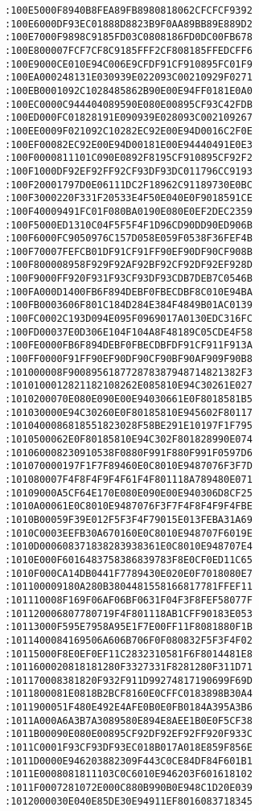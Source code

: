 \begin{lstlisting}[language={}, basicstyle=\scriptsize, caption=Машинний код]
:100E5000F8940B8FEA89FB8980818062CFCFCF9392
:100E6000DF93EC01888D8823B9F0AA89BB89E889D2
:100E7000F9898C9185FD03C0808186FD0DC00FB678
:100E800007FCF7CF8C9185FFF2CF808185FFEDCFF6
:100E9000CE010E94C006E9CFDF91CF910895FC01F9
:100EA000248131E030939E022093C00210929F0271
:100EB0001092C1028485862B90E00E94FF0181E0A0
:100EC0000C944404089590E080E00895CF93C42FDB
:100ED000FC01828191E090939E028093C002109267
:100EE0009F021092C10282EC92E00E94D0016C2F0E
:100EF00082EC92E00E94D00181E00E94440491E0E3
:100F0000811101C090E0892F8195CF910895CF92F2
:100F1000DF92EF92FF92CF93DF93DC011796CC9193
:100F20001797D0E06111DC2F18962C91189730E0BC
:100F3000220F331F20533E4F50E040E0F9018591CE
:100F40009491FC01F080BA0190E080E0EF2DEC2359
:100F5000ED1310C04F5F5F4F1D96CD90DD90ED906B
:100F6000FC9050976C157D058E059F0538F36FEF4B
:100F70007FEFCB01DF91CF91FF90EF90DF90CF908B
:100F800008958F929F92AF92BF92CF92DF92EF928D
:100F9000FF920F931F93CF93DF93CDB7DEB7C0546B
:100FA000D1400FB6F894DEBF0FBECDBF8C010E94BA
:100FB0003606F801C184D284E384F4849B01AC0139
:100FC0002C193D094E095F0969017A0130EDC316FC
:100FD00037E0D306E104F104A8F48189C05CDE4F58
:100FE0000FB6F894DEBF0FBECDBFDF91CF911F913A
:100FF0000F91FF90EF90DF90CF90BF90AF909F90B8
:101000008F900895618772878387948714821382F3
:1010100012821182108262E085810E94C30261E027
:1010200070E080E090E00E94030661E0F8018581B5
:101030000E94C30260E0F80185810E945602F80117
:1010400086818551823028F58BE291E10197F1F795
:1010500062E0F80185810E94C302F801828990E074
:101060008230910538F0880F991F880F991F0597D6
:101070000197F1F7F89460E0C8010E9487076F3F7D
:101080007F4F8F4F9F4F61F4F801118A789480E071
:10109000A5CF64E170E080E090E00E940306D8CF25
:1010A00061E0C8010E9487076F3F7F4F8F4F9F4FBE
:1010B00059F39E012F5F3F4F79015E013FEBA31A69
:1010C0003EEFB30A670160E0C8010E948707F6019E
:1010D000608371838283938361E0C8010E948707E4
:1010E000F6016483758386839783F8E0CF0ED11C65
:1010F000CA14DB0441F7789430E020E0F7018080E7
:101100009180A280B3804481558166817781FFEF11
:101110008F169F06AF06BF0631F04F3F8FEF58077F
:101120006807780719F4F801118AB1CFF90183E053
:10113000F595E7958A95E1F7E00FF11F8081880F1B
:1011400084169506A606B706F0F080832F5F3F4F02
:10115000F8E0EF0EF11C2832310581F6F8014481E8
:1011600020818181280F3327331F8281280F311D71
:101170008381820F932F911D99274817190699F69D
:1011800081E0818B2BCF8160E0CFFC0183898B30A4
:1011900051F480E492E4AFE0B0E0FB0184A395A3B6
:1011A000A6A3B7A3089580E894E8AEE1B0E0F5CF38
:1011B00090E080E00895CF92DF92EF92FF920F933C
:1011C0001F93CF93DF93EC018B017A018E859F856E
:1011D0000E946203882309F443C0CE84DF84F601B1
:1011E0008081811103C0C6010E946203F601618102
:1011F0007281072E000C880B990B0E948C1D20E039
:1012000030E040E85DE30E94911EF8016083718345

\end{lstlisting}
